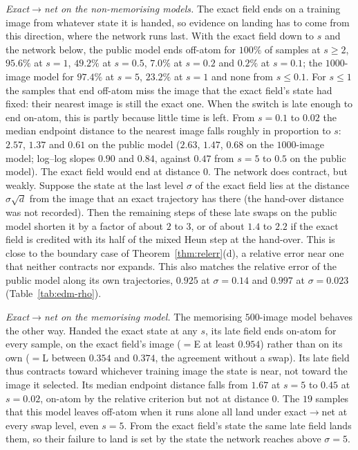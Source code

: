 \documentclass{article} %
\theoremstyle{plain}
\theoremstyle{definition}
\theoremstyle{remark}
\begin{document}
\emph{Exact$\to$net on the non-memorising models.} The exact field ends on a training image from
whatever state it is handed, so evidence on landing has to come from this direction, where the
network runs last. With the exact field down to $s$ and the network below, the public model ends
off-atom for $100\%$ of samples at $s\ge2$, $95.6\%$ at $s=1$, $49.2\%$ at $s=0.5$, $7.0\%$ at
$s=0.2$ and $0.2\%$ at $s=0.1$; the $1000$-image model for $97.4\%$ at $s=5$, $23.2\%$ at $s=1$ and
none from $s\le0.1$. For $s\le1$ the samples that end off-atom miss the image that the exact field's
state had fixed: their nearest image is still the exact one. When the switch is late enough to end
on-atom, this is partly because little time is left. From $s=0.1$ to $0.02$ the median endpoint
distance to the nearest image falls roughly in proportion to $s$: $2.57$, $1.37$ and $0.61$ on the
public model ($2.63$, $1.47$, $0.68$ on the $1000$-image model; log--log slopes $0.90$ and $0.84$,
against $0.47$ from $s=5$ to $0.5$ on the public model). The exact field would end at distance $0$.
The network does contract, but weakly. Suppose the state at the last level $\sigma$ of the exact
field lies at the distance $\sigma\sqrt d$ from the image that an exact trajectory has there (the
hand-over distance was not recorded). Then the remaining steps of these late swaps on the public
model shorten it by a factor of about $2$ to $3$, or of about $1.4$ to $2.2$ if the exact field is
credited with its half of the mixed Heun step at the hand-over. This is close to the boundary case
of Theorem~\ref{thm:relerr}(d), a relative error near one that neither contracts nor expands. This
also matches the relative error of the public model along its own trajectories, $0.925$ at
$\sigma=0.14$ and $0.997$ at $\sigma=0.023$ (Table~\ref{tab:edm-rho}).

\emph{Exact$\to$net on the memorising model.} The memorising $500$-image model behaves the other way.
Handed the exact state at any $s$, its late field ends on-atom for every sample, on the exact
field's image ($=$E at least $0.954$) rather than on its own ($=$L between $0.354$ and $0.374$, the
agreement without a swap). Its late field thus contracts toward whichever training image the state
is near, not toward the image it selected. Its median endpoint distance falls from $1.67$ at $s=5$
to $0.45$ at $s=0.02$, on-atom by the relative criterion but not at distance $0$. The $19$ samples
that this model leaves off-atom when it runs alone all land under exact$\to$net at every swap
level, even $s=5$. From the exact field's state the same late field lands them, so their failure to
land is set by the state the network reaches above $\sigma=5$.
\end{document}
